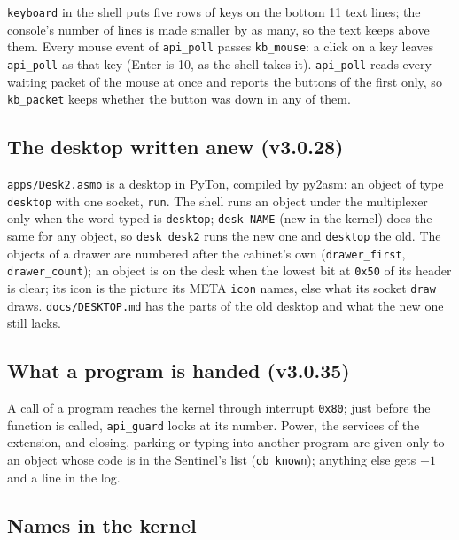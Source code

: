 \documentclass[11pt,a4paper]{article}
\newcommand{\file}[1]{\texttt{#1}}
\newcommand{\cmd}[1]{\texttt{#1}}
\begin{document}
\cmd{keyboard} in the shell puts five rows of keys on the bottom 11 text lines; the console's
number of lines is made smaller by as many, so the text keeps above them. Every mouse event of
\texttt{api\_poll} passes \texttt{kb\_mouse}: a click on a key leaves \texttt{api\_poll} as that
key (Enter is 10, as the shell takes it). \texttt{api\_poll} reads every waiting packet of the
mouse at once and reports the buttons of the first only, so \texttt{kb\_packet} keeps whether
the button was down in any of them.

\subsection{The desktop written anew (v3.0.28)}

\file{apps/Desk2.asmo} is a desktop in PyTon, compiled by py2asm: an object of type
\texttt{desktop} with one socket, \texttt{run}. The shell runs an object under the multiplexer
only when the word typed is \cmd{desktop}; \cmd{desk NAME} (new in the kernel) does the same
for any object, so \cmd{desk desk2} runs the new one and \cmd{desktop} the old. The objects of
a drawer are numbered after the cabinet's own (\texttt{drawer\_first}, \texttt{drawer\_count});
an object is on the desk when the lowest bit at \texttt{0x50} of its header is clear; its icon
is the picture its META \texttt{icon} names, else what its socket \texttt{draw} draws.
\file{docs/DESKTOP.md} has the parts of the old desktop and what the new one still lacks.

\subsection{What a program is handed (v3.0.35)}

A call of a program reaches the kernel through interrupt \texttt{0x80}; just before the function
is called, \texttt{api\_guard} looks at its number. Power, the services of the extension, and
closing, parking or typing into another program are given only to an object whose code is in
the Sentinel's list (\texttt{ob\_known}); anything else gets $-1$ and a line in the log.

\subsection{Names in the kernel}
\end{document}

